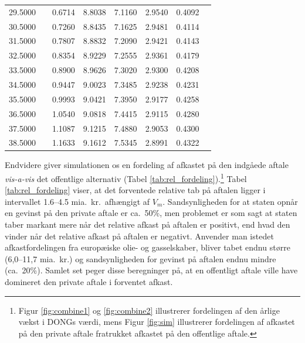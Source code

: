 \documentclass{article}
\begin{document}
\begin{table}[h]
\begin{tabularx}{0.95\linewidth}{cXcccccr}
 29.5000&&0.6714&8.8038&7.1160&2.9540&0.4092\\
 30.5000&&0.7260&8.8435&7.1625&2.9481&0.4114\\
 31.5000&&0.7807&8.8832&7.2090&2.9421&0.4143\\
 32.5000&&0.8354&8.9229&7.2555&2.9361&0.4179\\
 33.5000&&0.8900&8.9626&7.3020&2.9300&0.4208\\
 34.5000&&0.9447&9.0023&7.3485&2.9238&0.4231\\
 35.5000&&0.9993&9.0421&7.3950&2.9177&0.4258\\
 36.5000&&1.0540&9.0818&7.4415&2.9115&0.4280\\
 37.5000&&1.1087&9.1215&7.4880&2.9053&0.4300\\
 38.5000&&1.1633&9.1612&7.5345&2.8991&0.4322\\

\bottomrule[1pt]
	\end{tabularx}
	\begin{minipage}{\linewidth}
	\end{minipage}
\end{table}


Endvidere giver simulationen os en fordeling af afkastet på den indgåede aftale \emph{vis-a-vis} det offentlige alternativ (Tabel \ref{tab:rel_fordeling}).\footnote{Figur \ref{fig:combine1} og \ref{fig:combine2} illustrerer fordelingen af den årlige vækst i DONGs værdi, mens Figur \ref{fig:sim} illustrerer fordelingen af afkastet på den private aftale fratrukket afkastet på den offentlige aftale.} Tabel \ref{tab:rel_fordeling} viser, at det forventede relative tab på aftalen ligger i intervallet 1.6--4.5 mia.\ kr.\ afhængigt af $V_m$. Sandsynligheden for at staten opnår en gevinst på den private aftale er ca.\ 50\%, men problemet er som sagt at staten taber markant mere når det relative afkast på aftalen er positivt, end hvad den vinder når det relative afkast på aftalen er negativt. Anvender man istedet afkastfordelingen fra europæiske olie- og gasselskaber, bliver tabet endnu større (6,0--11,7 mia.\ kr.) og sandsynligheden for gevinst på aftalen endnu mindre (ca.\ 20\%). Samlet set peger disse beregninger på, at en offentligt aftale ville have domineret den private aftale i forventet afkast.
\end{document}
